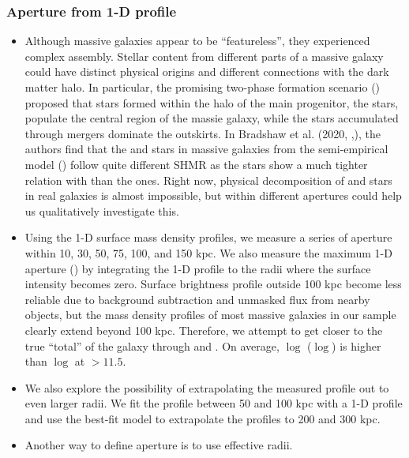 \documentclass[a4paper,fleqn,usenatbib]{mnras}
\begin{document}
\subsubsection{Aperture \mstar{} from 1-D profile}
    \label{sec:maper}
    

    \begin{itemize}

        \item Although massive galaxies appear to be ``featureless'', they experienced complex 
            assembly. Stellar content from different parts of a massive galaxy could have distinct 
            physical origins and different connections with the dark matter halo. 
            In particular, the promising two-phase formation scenario (\addref{}) proposed that
            stars formed within the halo of the main progenitor, the \insitu{} stars, populate the 
            central region of the massie galaxy, while the \exsitu{} stars accumulated through 
            mergers dominate the outskirts. 
            In Bradshaw et al. (2020, \addref{},), the authors find that the \insitu{} and \exsitu{}
            stars in massive galaxies from the \um{} semi-empirical model (\citealt{Behroozi2018}) 
            follow quite different SHMR as the \exsitu{} stars show a much tighter relation with 
            \mvir{} than the \insitu{} ones. 
            Right now, physical decomposition of \insitu{} and \exsitu{} stars in real galaxies 
            is almost impossible, but \mstar{} within different apertures could help us 
            qualitatively investigate this.
        
        \item Using the 1-D surface mass density profiles, we measure a series of aperture \mstar{}
            within 10, 30, 50, 75, 100, and 150 kpc.
            We also measure the maximum 1-D aperture \mstar{} (\mmax{}) by 
            integrating the 1-D profile to the radii where the surface intensity becomes zero.
            Surface brightness profile outside 100 kpc become less reliable due to background 
            subtraction and unmasked flux from nearby objects, but the mass density profiles
            of most massive galaxies in our sample clearly extend beyond 100 kpc.
            Therefore, we attempt to get closer to the true ``total'' \mstar{} of the galaxy
            through \mmax{} and .
            On average, $\log$\mmax{} ($\log$) is  higher than 
            $\log$ at $>11.5$.
        
        \item We also explore the possibility of extrapolating the measured profile out to 
            even larger radii.
            We fit the profile between 50 and 100 kpc with a 1-D \ser{} profile and use the best-fit 
            model to extrapolate the profiles to 200 and 300 kpc. 
            
        \item Another way to define aperture is to use effective radii. 

    \end{itemize}
\end{document}
